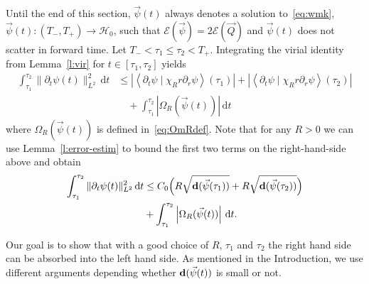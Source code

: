 \documentclass[10pt,reqno]{amsart}
\newcommand{\E}{\mathcal{E}}
\newcommand{\HH}{\mathcal{H}}
\newcommand{\Om}{\Omega}
\newcommand{\p}{\partial}
\newcommand{\ang}[1]{\left\langle{#1}\right\rangle}
\newcommand{\abs}[1]{\left\lvert{#1}\right\rvert}
\newcommand{\EQ}[1]{\begin{equation}\begin{split} #1 \end{split}\end{equation}}
\numberwithin{equation}{section}
\theoremstyle{remark}
\newcommand{\ud}{\mathrm{d}}
\newcommand{\0}{\emptyset}
\newcommand{\bfd}{{\bf d}}
\begin{document}
Until the end of this section, $\vec \psi(t)$ always denotes a solution to~\eqref{eq:wmk}, $\vec\psi(t):(T_-, T_+) \to \HH_0$,
such that $\E(\vec \psi) = 2 \E(\vec Q)$
and $\vec\psi(t)$ does not scatter in forward time.
Let $T_- < \tau_1 \leq \tau_2 < T_+$. Integrating the virial identity from Lemma~\ref{l:vir} for $t \in [\tau_1, \tau_2]$ yields 
\EQ{ \label{eq:virtau}
\int_{\tau_1}^{\tau_2} \| \p_t \psi (t) \|_{L^2}^2 \,  \ud t  &\le  \abs{ \ang{ \p_t\psi \mid \chi_R r \p_r \psi}(\tau_1)}  + \abs{ \ang{ \p_t\psi \mid   \chi_R r \p_r \psi}(\tau_2)} \\
 &\quad +  \int_{\tau_1}^{\tau_2} \abs{\Om_{R}( \vec \psi(t))} \, \ud t
 }
 where $\Om_{R}(\vec \psi(t))$ is defined in~\eqref{eq:OmRdef}.
  Note that for any $R>0$ we can use Lemma~\ref{l:error-estim} to bound the first two terms on the right-hand-side above and obtain
 \EQ{ \label{eq:virR} 
 \begin{aligned}
 \int_{\tau_1}^{\tau_2} \| \p_t \psi (t) \|_{L^2}^2 \,  \ud t  &\leq C_0\Big(  R \sqrt{\bfd(\vec\psi(\tau_1))} +  R \sqrt{\bfd(\vec\psi(\tau_2))}\Big) \\ &+  \int_{\tau_1}^{\tau_2} \abs{\Om_{R}( \vec \psi(t))} \, \ud t.
 \end{aligned}
 }

 Our goal is to show that with a good choice of $R$, $\tau_1$ and $\tau_2$
 the right hand side can be absorbed into the left hand side.
 As mentioned in the Introduction, we use different arguments
 depending whether $\bfd(\vec\psi(t))$ is small or not.
  
\end{document}
